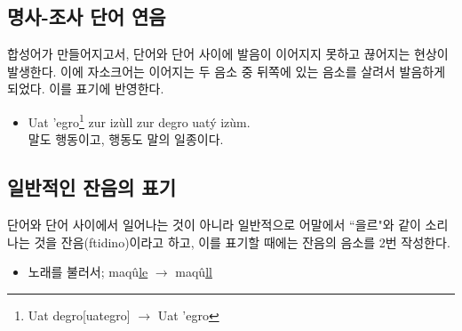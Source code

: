 \documentclass{article}
\begin{document}
\subsection{명사-조사 단어 연음}

합성어가 만들어지고서, 단어와 단어 사이에 발음이 이어지지 못하고 끊어지는 현상이 발생한다. 이에 자소크어는 이어지는 두 음소 중 뒤쪽에 있는 음소를 살려서 발음하게 되었다. 이를 표기에 반영한다.

\begin{itemize}
	\item Uat 'egro\footnote{Uat degro[uategro] $\rightarrow$ Uat 'egro} zur izùll zur degro uatý izùm. \\ 말도 행동이고, 행동도 말의 일종이다.
\end{itemize}

\subsection{일반적인 잔음의 표기}

단어와 단어 사이에서 일어나는 것이 아니라 일반적으로 어말에서 ``을르"와 같이 소리나는 것을 잔음(ftidino)이라고 하고, 이를 표기할 때에는 잔음의 음소를 2번 작성한다.

\begin{itemize}
	\item 노래를 불러서; maqû\underline{le} $\rightarrow$ maqû\underline{ll}
\end{itemize}
\end{document}
